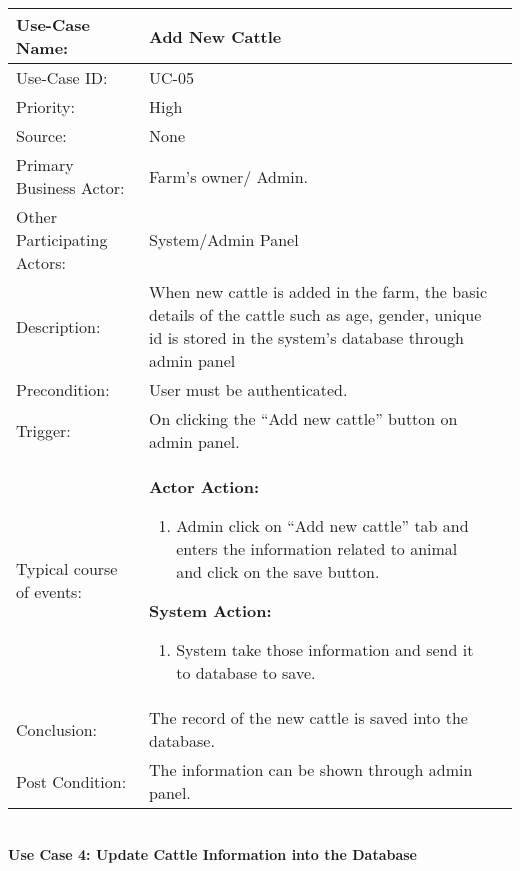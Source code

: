 \begin{tabular}{|l|p{}|p{}|}
	\hline
	Use-Case Name: & Add New Cattle\\ \hline
	Use-Case ID:& UC-05 \\\hline
	Priority:& High\\ \hline
	Source:& None \\ \hline
	Primary Business Actor: & Farm's owner/ Admin.\\ \hline
	Other Participating Actors:&  System/Admin Panel\\ \hline
	Description:& When new cattle is added in the farm, the basic details of the cattle such as age, gender, unique id is stored in the system’s database through admin panel \\ \hline
	Precondition:& User must be authenticated.   \\ \hline
	Trigger:& On clicking the “Add new cattle” button on admin panel.    \\ \hline 
	Typical course of events:&  \textbf{Actor Action:}
	\begin{enumerate}
		\item Admin click on “Add new cattle” tab and enters the information related to animal and click on the save button.  
	\end{enumerate}
	\textbf{System Action: }
	\begin{enumerate}
		\item 	System take those information and send it to database to save. 
	\end{enumerate}
	
	\\ \hline
	Conclusion:  & The record of the new cattle is saved into the database. \\ \hline
	Post Condition: &The information can be shown through admin panel.  \\ \hline
\end{tabular}\\


\pagebreak
\textbf{Use Case 4: Update Cattle Information into the Database}\\


